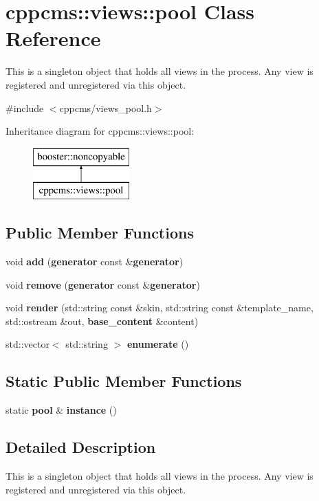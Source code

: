 \section{cppcms\-:\-:views\-:\-:pool \-Class \-Reference}
\label{classcppcms_1_1views_1_1pool}


\-This is a singleton object that holds all views in the process. \-Any view is registered and unregistered via this object.  




{\ttfamily \#include $<$cppcms/views\-\_\-pool.\-h$>$}

\-Inheritance diagram for cppcms\-:\-:views\-:\-:pool\-:\begin{figure}[H]
\begin{center}
\leavevmode
\includegraphics[height=2.000000cm]{classcppcms_1_1views_1_1pool}
\end{center}
\end{figure}
\subsection*{\-Public \-Member \-Functions}
\begin{DoxyCompactItemize}
\item 
void {\bf add} ({\bf generator} const \&{\bf generator})
\item 
void {\bf remove} ({\bf generator} const \&{\bf generator})
\item 
void {\bf render} (std\-::string const \&skin, std\-::string const \&template\-\_\-name, std\-::ostream \&out, {\bf base\-\_\-content} \&content)
\item 
std\-::vector$<$ std\-::string $>$ {\bf enumerate} ()
\end{DoxyCompactItemize}
\subsection*{\-Static \-Public \-Member \-Functions}
\begin{DoxyCompactItemize}
\item 
static {\bf pool} \& {\bf instance} ()
\end{DoxyCompactItemize}


\subsection{\-Detailed \-Description}
\-This is a singleton object that holds all views in the process. \-Any view is registered and unregistered via this object. 

